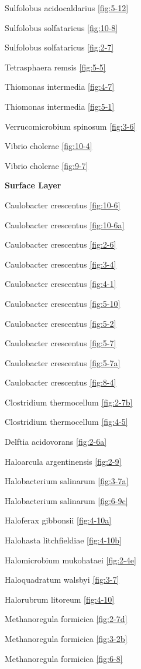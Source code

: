 \documentclass[]{tufte-book}
\begin{document}
Sulfolobus acidocaldarius \ref{fig:5-12}

Sulfolobus solfataricus \ref{fig:10-8}

Sulfolobus solfataricus \ref{fig:2-7}

Tetrasphaera remsis \ref{fig:5-5}

Thiomonas intermedia \ref{fig:4-7}

Thiomonas intermedia \ref{fig:5-1}

Verrucomicrobium spinosum \ref{fig:3-6}

Vibrio cholerae \ref{fig:10-4}

Vibrio cholerae \ref{fig:9-7}

\textbf{Surface Layer}

Caulobacter crescentus \ref{fig:10-6}

Caulobacter crescentus \ref{fig:10-6a}

Caulobacter crescentus \ref{fig:2-6}

Caulobacter crescentus \ref{fig:3-4}

Caulobacter crescentus \ref{fig:4-1}

Caulobacter crescentus \ref{fig:5-10}

Caulobacter crescentus \ref{fig:5-2}

Caulobacter crescentus \ref{fig:5-7}

Caulobacter crescentus \ref{fig:5-7a}

Caulobacter crescentus \ref{fig:8-4}

Clostridium thermocellum \ref{fig:2-7b}

Clostridium thermocellum \ref{fig:4-5}

Delftia acidovorans \ref{fig:2-6a}

Haloarcula argentinensis \ref{fig:2-9}

Halobacterium salinarum \ref{fig:3-7a}

Halobacterium salinarum \ref{fig:6-9c}

Haloferax gibbonsii \ref{fig:4-10a}

Halohasta litchfieldiae \ref{fig:4-10b}

Halomicrobium mukohataei \ref{fig:2-4e}

Haloquadratum walsbyi \ref{fig:3-7}

Halorubrum litoreum \ref{fig:4-10}

Methanoregula formicica \ref{fig:2-7d}

Methanoregula formicica \ref{fig:3-2b}

Methanoregula formicica \ref{fig:6-8}
\end{document}
